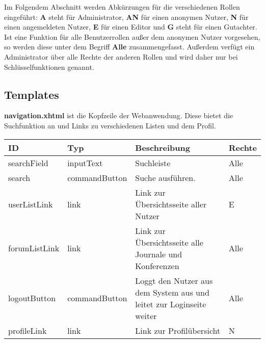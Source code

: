 \newcommand{\ftable}[1]{\begin{longtable}[H]{|m{2cm}|m{3cm}|m{6cm}|m{2.5cm}|}
                            \hline
                            \textbf{ID} & \textbf{Typ} & \textbf{Beschreibung} & \textbf{Rechte} \\
                            \hline
                            \hline
                            #1
\end{longtable}
}

\newcommand{\fentry}[4]{#1 & #2 & #3 & #4 \\
\hline}



Im Folgendem Abschnitt werden Abkürzungen für die verschiedenen Rollen eingeführt:
\textbf{A} steht für Administrator, \textbf{AN} für einen anonymen Nutzer, \textbf{N} für einen angemeldeten Nutzer, \textbf{E} für einen Editor und \textbf{G} steht für einen Gutachter.
Ist eine Funktion für alle Benutzerrollen außer dem anonymen Nutzer vorgesehen, so werden diese unter dem Begriff \textbf{Alle} zusammengefasst.
Außerdem verfügt ein Administrator über alle Rechte der anderen Rollen und wird daher nur bei Schlüsselfunktionen genannt.

\subsection{Templates}



\begin{samepage}
    \textbf{navigation.xhtml} \label{flt:navbar} ist die Kopfzeile der Webanwendung. Diese bietet die Suchfunktion an und Links zu verschiedenen Listen und dem Profil.
    \nopagebreak

    \ftable{
        \fentry{searchField}{inputText}{Suchleiste}{Alle}

        \fentry{search}{commandButton}{Suche ausführen.}{Alle}

        \fentry{userListLink}{link}{Link zur Übersichtsseite aller Nutzer}{E}

        \fentry{forumListLink}{link}{Link zur Übersichtsseite alle Journale und Konferenzen}{Alle}

        \fentry{logoutButton}{commandButton}{Loggt den Nutzer aus dem System aus und leitet zur Loginseite weiter}{Alle}

        \fentry{profileLink}{link}{Link zur Profilübersicht}{N}

    }
\end{samepage}

